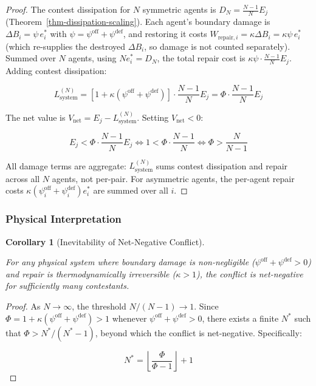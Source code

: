 \documentclass[11pt]{article}
\theoremstyle{plain}
\newtheorem{corollary}[theorem]{Corollary}
\theoremstyle{definition}
\theoremstyle{remark}
\let\origsubsubsection\subsubsection
\renewcommand{\subsubsection}{\needspace{4\baselineskip}\origsubsubsection}
\begin{document}
\begin{proof}
The contest dissipation for $N$ symmetric agents is $D_N = \frac{N-1}{N} E_j$ (Theorem~\ref{thm-dissipation-scaling}). Each agent's boundary damage is $\Delta B_i = \psi \, e_i^*$ with $\psi = \psi^{\text{off}} + \psi^{\text{def}}$, and restoring it costs $W_{\text{repair},i} = \kappa \Delta B_i = \kappa \psi \, e_i^*$ (which re-supplies the destroyed $\Delta B_i$, so damage is not counted separately). Summed over $N$ agents, using $N e_i^* = D_N$, the total repair cost is $\kappa \psi \cdot \frac{N-1}{N} E_j$. Adding contest dissipation:

$$L_{\text{system}}^{(N)} = \left[1 + \kappa(\psi^{\text{off}} + \psi^{\text{def}})\right] \cdot \frac{N-1}{N} E_j = \Phi \cdot \frac{N-1}{N} E_j$$

The net value is $V_{\text{net}} = E_j - L_{\text{system}}^{(N)}$. Setting $V_{\text{net}} < 0$:

$$E_j < \Phi \cdot \frac{N-1}{N} E_j \iff 1 < \Phi \cdot \frac{N-1}{N} \iff \Phi > \frac{N}{N-1}$$

All damage terms are aggregate: $L_{\text{system}}^{(N)}$ sums contest dissipation and repair across all $N$ agents, not per-pair. For asymmetric agents, the per-agent repair costs $\kappa(\psi_i^{\text{off}} + \psi_i^{\text{def}}) e_i^*$ are summed over all $i$.
\end{proof}

\subsubsection{Physical
Interpretation}\label{physical-interpretation-net-negative}

\begin{corollary}[Inevitability of Net-Negative Conflict]
\label{cor-inevitability-net-negative}

For any physical system where boundary damage is non-negligible ($\psi^{\text{off}} + \psi^{\text{def}} > 0$) and repair is thermodynamically irreversible ($\kappa > 1$), the conflict is net-negative for sufficiently many contestants.
\end{corollary}

\begin{proof}
As $N \to \infty$, the threshold $N/(N-1) \to 1$. Since $\Phi = 1 + \kappa(\psi^{\text{off}} + \psi^{\text{def}}) > 1$ whenever $\psi^{\text{off}} + \psi^{\text{def}} > 0$, there exists a finite $N^*$ such that $\Phi > N^*/(N^* - 1)$, beyond which the conflict is net-negative. Specifically:

$$N^* = \left\lfloor \frac{\Phi}{\Phi - 1} \right\rfloor + 1$$
\end{proof}
\end{document}
